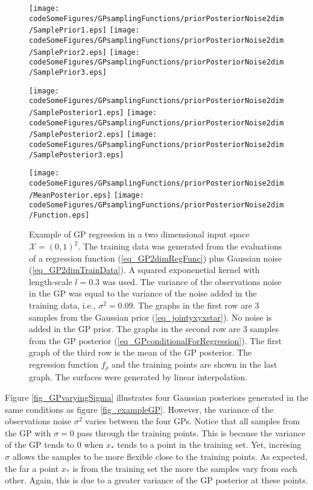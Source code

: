 \begin{sidewaysfigure}[!htbp]
  \centering 
    \texttt{[image: codeSomeFigures/GPsamplingFunctions/priorPosteriorNoise2dim/SamplePrior1.eps]}
    \texttt{[image: codeSomeFigures/GPsamplingFunctions/priorPosteriorNoise2dim/SamplePrior2.eps]}
    \texttt{[image: codeSomeFigures/GPsamplingFunctions/priorPosteriorNoise2dim/SamplePrior3.eps]}
    \vspace{2mm}
     
    \texttt{[image: codeSomeFigures/GPsamplingFunctions/priorPosteriorNoise2dim/SamplePosterior1.eps]}
    \texttt{[image: codeSomeFigures/GPsamplingFunctions/priorPosteriorNoise2dim/SamplePosterior2.eps]}
    \texttt{[image: codeSomeFigures/GPsamplingFunctions/priorPosteriorNoise2dim/SamplePosterior3.eps]}
    \vspace{2mm}

    \texttt{[image: codeSomeFigures/GPsamplingFunctions/priorPosteriorNoise2dim/MeanPosterior.eps]}
    \texttt{[image: codeSomeFigures/GPsamplingFunctions/priorPosteriorNoise2dim/Function.eps]}
  

  \caption[Example of GP regression]%
{
  Example of GP regression in a two dimensional input space $\mathcal{X} = (0,1)^2$. The training data was generated from the evaluations of a regression function (\ref{eq_GP2dimRegFunc}) plus Gaussian noise (\ref{eq_GP2dimTrainData}). A squared exponenetial kernel with length-scale $l=0.3$ was used. The variance of the observations noise in the GP was equal to the variance of the noise added in the training data, i.e., $\sigma^2 = 0.09$. The graphs in the first row are $3$ samples from the Gaussian prior (\ref{eq_jointyxyxstar}). No noise is added in the GP prior. The graphs in the second row are $3$ samples from the GP posterior (\ref{eq_GPconditionalForRegression}). The first graph of the third row is the mean of the GP posterior. The regression function $f_{\rho}$ and the training points are shown in the last graph. The surfaces were generated by linear interpolation.
}
\label{fig_GP2dim}
\end{sidewaysfigure}

Figure \ref{fig_GPvaryingSigma} illustrates four Gaussian posteriors generated in the same conditions as figure \ref{fig_exampleGP}. However, the variance of the observations noise $\sigma^2$ varies between the four GPs. Notice that all samples from the GP with $\sigma = 0$ pass through the training points. This is because the variance of the GP tends to $0$ when $x_*$ tends to a point in the training set. Yet, incresing $\sigma$ allows the samples to be more flexible close to the training points. As expected, the far a point $x_*$ is from the training set the more the samples vary from each other. Again, this is due to a greater variance of the GP posterior at these points.

